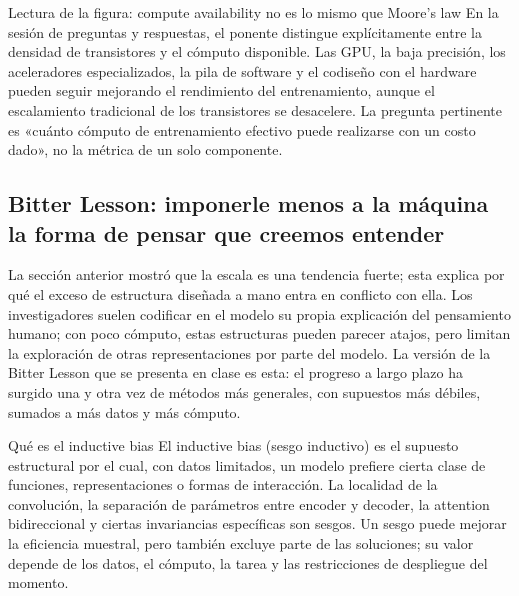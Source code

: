 \begin{knowledgebox}{Lectura de la figura: compute availability no es lo mismo que Moore's law}
En la sesión de preguntas y respuestas, el ponente distingue explícitamente entre la densidad de transistores y el cómputo disponible. Las GPU, la baja precisión, los aceleradores especializados, la pila de software y el codiseño con el hardware pueden seguir mejorando el rendimiento del entrenamiento, aunque el escalamiento tradicional de los transistores se desacelere. La pregunta pertinente es «cuánto cómputo de entrenamiento efectivo puede realizarse con un costo dado», no la métrica de un solo componente.
\end{knowledgebox}


\subsection{Bitter Lesson: imponerle menos a la máquina la forma de pensar que creemos entender}

La sección anterior mostró que la escala es una tendencia fuerte; esta explica por qué el exceso de estructura diseñada a mano entra en conflicto con ella. Los investigadores suelen codificar en el modelo su propia explicación del pensamiento humano; con poco cómputo, estas estructuras pueden parecer atajos, pero limitan la exploración de otras representaciones por parte del modelo. La versión de la Bitter Lesson que se presenta en clase es esta: el progreso a largo plazo ha surgido una y otra vez de métodos más generales, con supuestos más débiles, sumados a más datos y más cómputo.



\begin{importantbox}{Qué es el inductive bias}
El inductive bias (sesgo inductivo) es el supuesto estructural por el cual, con datos limitados, un modelo prefiere cierta clase de funciones, representaciones o formas de interacción. La localidad de la convolución, la separación de parámetros entre encoder y decoder, la attention bidireccional y ciertas invariancias específicas son sesgos. Un sesgo puede mejorar la eficiencia muestral, pero también excluye parte de las soluciones; su valor depende de los datos, el cómputo, la tarea y las restricciones de despliegue del momento.
\end{importantbox}

